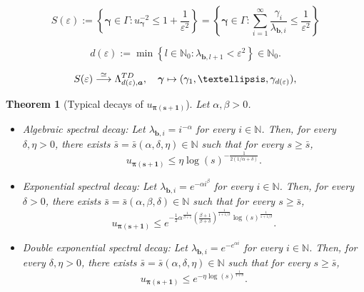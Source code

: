 \documentclass[10pt,a4paper]{amsart}
\newtheorem{theorem}{Theorem}
\newcommand*{\bbN}{\mathbb{N}}
\begin{document}
\begin{equation}
\label{eq: s-term: definition of S_varepsilon}
    S(\varepsilon) := \left\{\bm{\gamma} \in \Gamma: u_{\bm{\gamma}}^{-2} \leq 1 + \frac{1}{\varepsilon^2} \right\}
    = \left\{\bm{\gamma} \in \Gamma: \sum_{i = 1}^{\infty} \frac{\gamma_i}{\lambda_{\bm{b}, i}} \leq \frac{1}{\varepsilon^2} \right\}
\end{equation}

\begin{equation}
\label{eq: s-term: effective dimension d}
    d(\varepsilon)
    := \min \left\{l \in \bbN_0: \lambda_{\bm{b}, l+1} < \varepsilon^2 \right\} \in \bbN_0.
\end{equation}

\begin{equation}
\label{eq: s-term: S_varepsilon isomorphic to anisotropic TD index set}
    S(\varepsilon) \overset{\simeq}{\longrightarrow} \Lambda_{d(\varepsilon), \bm{a}}^{\textup{TD}}, \quad \bm{\gamma} \mapsto (\gamma_1, \dots, \gamma_{d(\varepsilon)}),
\end{equation}

\begin{theorem}[Typical decays of \(u_{\bm{\pi(s + 1)}}\)]
\label{thm: s-term: upper bounds for u_pi(s+1)}
Let \(\alpha, \beta > 0\).
\begin{itemize}  
    \item [(a)] \emph{Algebraic spectral decay:} Let \(\lambda_{\bm{b}, i} = i^{-\alpha}\) for every \(i \in \bbN\). Then, for every \(\delta, \eta > 0\), there exists \(\bar{s} = \bar{s}(\alpha, \delta, \eta) \in \bbN\) such that for every \(s \geq \bar{s}\),
    \begin{equation}
    \label{eq: s-term: upper bound: algebraic}
        u_{\bm{\pi(s + 1)}} \leq \eta \log(s)^{-\frac{1}{2(1/\alpha + \delta)}}.
    \end{equation}

    \item [(b)] \emph{Exponential spectral decay:} Let \(\lambda_{\bm{b}, i} = e^{-\alpha i^{\beta}}\) for every \(i \in \bbN\). Then, for every \(\delta > 0\), there exists \(\bar{s} = \bar{s}(\alpha, \beta, \delta) \in \bbN\) such that for every \(s \geq \bar{s}\),
    \begin{equation}
    \label{eq: s-term: upper bound: exponential}
        u_{\bm{\pi(s + 1)}} \leq e^{- \frac{1}{2} \alpha^{\frac{1}{\beta + 1}} \left( \frac{\beta + 1}{\beta + \delta}  \right)^{\frac{1}{1 + 1/\beta}} \log(s)^{\frac{1}{1 + 1/\beta}}}.
    \end{equation}
    
    \item [(c)] \emph{Double exponential spectral decay:} Let \(\lambda_{\bm{b}, i} = e^{-e^{\alpha i}}\) for every \(i \in \bbN\). Then, for every \(\delta, \eta > 0\), there exists \(\bar{s} = \bar{s}(\alpha, \delta, \eta) \in \bbN\) such that for every \(s \geq \bar{s}\),
    \begin{equation}
    \label{eq: s-term: upper bound: double exponential}
        u_{\bm{\pi(s + 1)}} \leq e^{- \eta \log(s)^{\frac{1}{1 + \delta}}}.
    \end{equation}
\end{itemize}
\end{theorem}
\end{document}
